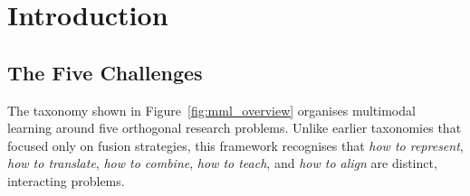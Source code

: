 \documentclass[12pt,a4paper]{article}
\theoremstyle{definition}
\theoremstyle{plain}
\theoremstyle{remark}
\begin{document}
\section{Introduction}

\subsection{The Five Challenges}

The taxonomy shown in Figure~\ref{fig:mml_overview} organises multimodal learning around five orthogonal research problems. Unlike earlier taxonomies that focused only on fusion strategies, this framework recognises that \emph{how to represent}, \emph{how to translate}, \emph{how to combine}, \emph{how to teach}, and \emph{how to align} are distinct, interacting problems.
\end{document}
